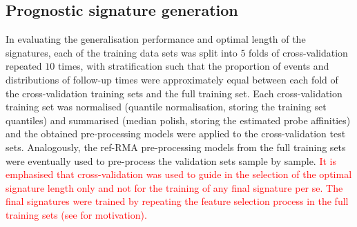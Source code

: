 \documentclass[letterpaper,12pt]{article}
\begin{document}
\subsection{Prognostic signature generation}
In evaluating the generalisation performance and optimal length of the signatures, each of the training data sets was split into $5$ folds of cross-validation repeated $10$ times, with stratification such that the proportion of events and distributions of follow-up times were approximately equal between each fold of the cross-validation training sets and the full training set. Each cross-validation training set was normalised (quantile normalisation, storing the training set quantiles) and summarised (median polish, storing the estimated probe affinities) and the obtained pre-processing models were applied to the cross-validation test sets. Analogously, the ref-RMA pre-processing models from the full training sets were eventually used to pre-process the validation sets sample by sample. \textcolor{red}{It is emphasised that cross-validation was used to guide in the selection of the optimal signature length only and not for the training of any final signature per se. The final signatures were trained by repeating the feature selection process in the full training sets (see \citet{Simon:12} for motivation).}
\end{document}

